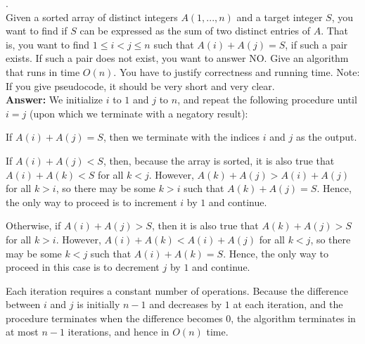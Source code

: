 \documentclass[a4paper,11pt]{article}
\begin{document}
. \\
Given a sorted array of distinct integers $A(1,...,n)$ and a target integer $S$, you want to find if 
$S$ can be expressed as the sum of two distinct entries of $A$. That is, you want to find $1 \leq i < j \leq n$
such that $A(i)+A(j)=S$, if such a pair exists. If such a pair does not exist, you want to answer NO. 
Give an algorithm that runs in time $O(n)$. You have to justify correctness and running time.
Note: If you give pseudocode, it should be very short and very clear.\\
{\bf Answer:}
We initialize $i$ to $1$ and $j$ to $n$, and repeat the following procedure until $i = j$ (upon which we terminate with a negatory result): \par
If $A(i) + A(j) = S$, then we terminate with the indices $i$ and $j$ as the output. \par
If $A(i) + A(j) < S$, then, because the array is sorted, it is also true that $A(i) + A(k) < S$ for all $k < j$. However, $A(k) + A(j) > A(i) + A(j)$ for all $k > i$, so there may be some $k > i$ such that $A(k) + A(j) = S$. Hence, the only way to proceed is to increment $i$ by $1$ and continue. \par
Otherwise, if $A(i) + A(j) > S$, then it is also true that $A(k) + A(j) > S$ for all $k > i$. However, $A(i) + A(k) < A(i) + A(j)$ for all $k < j$, so there may be some $k < j$ such that $A(i) + A(k) = S$. Hence, the only way to proceed in this case is to decrement $j$ by $1$ and continue. \par
Each iteration requires a constant number of operations. Because the difference between $i$ and $j$ is initially $n - 1$ and decreases by $1$ at each iteration, and the procedure terminates when the difference becomes $0$, the algorithm terminates in at most $n - 1$ iterations, and hence in $O(n)$ time.
\end{document}
